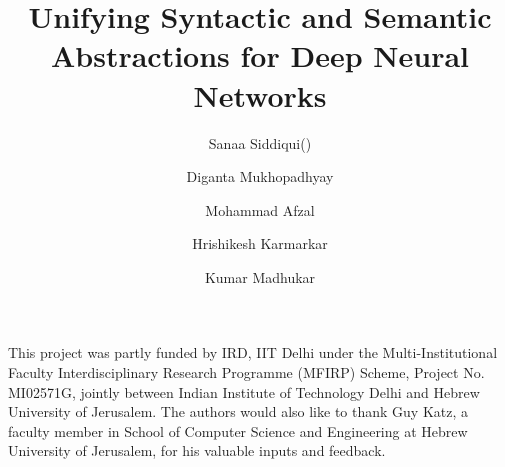 \documentclass[runningheads]{llncs}
\begin{document}
\title{Unifying Syntactic and Semantic Abstractions for Deep Neural Networks}


\author{
    Sanaa Siddiqui(\Envelope) \and
    Diganta Mukhopadhyay \and
    Mohammad Afzal \and
    Hrishikesh Karmarkar \and
    Kumar Madhukar
}

 

\maketitle             








 

\begin{credits}
\subsubsection{\ackname} 
This project was partly funded by IRD, IIT Delhi under the Multi-Institutional 
Faculty Interdisciplinary Research Programme (MFIRP) Scheme, Project No. MI02571G,
jointly between Indian Institute of Technology Delhi and Hebrew University of 
Jerusalem. The authors would also like to thank Guy Katz, a faculty member in 
School of Computer Science and Engineering at Hebrew University of Jerusalem, 
for his valuable inputs and feedback.

\subsubsection{\discintname}

\end{credits}

%



\end{document}
